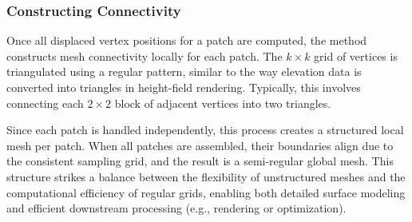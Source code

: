 \subsubsection{Constructing Connectivity}

Once all displaced vertex positions for a patch are computed, the method constructs mesh connectivity locally for each patch. 
The $k \times k$ grid of vertices is triangulated using a regular pattern, similar to the way elevation data is converted into triangles in height-field rendering. 
Typically, this involves connecting each $2 \times 2$ block of adjacent vertices into two triangles. 

Since each patch is handled independently, this process creates a structured local mesh per patch. 
When all patches are assembled, their boundaries align due to the consistent sampling grid, and the result is a semi-regular global mesh. 
This structure strikes a balance between the flexibility of unstructured meshes and the computational efficiency of regular grids, enabling both detailed surface modeling and efficient downstream processing (e.g., rendering or optimization). 







